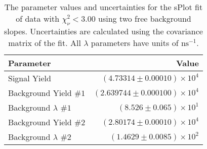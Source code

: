 
\begin{table}[ht]
    \begin{center}
        \begin{tabular}{lr}\toprule
            Parameter & Value \\\midrule
            Signal Yield & $(4.73314 \pm 0.00010) \times 10^{4}$ \\
            Background Yield $\#1$ & $(2.639744 \pm 0.000100) \times 10^{4}$ \\
            Background $\lambda$ $\#1$ & $(8.526 \pm 0.065) \times 10^{1}$ \\
            Background Yield $\#2$ & $(2.80174 \pm 0.00010) \times 10^{4}$ \\
            Background $\lambda$ $\#2$ & $(1.4629 \pm 0.0085) \times 10^{2}$ \\\bottomrule
        \end{tabular}
        \caption{The parameter values and uncertainties for the sPlot fit of data with $\chi^2_\nu < 3.00$ using two free background slopes. Uncertainties are calculated using the covariance matrix of the fit. All $\lambda$ parameters have units of $\si{\nano\second}^{-1}$.}\label{tab:splot-fit-results-chisqdof-3.00-free-2}
    \end{center}
\end{table}
